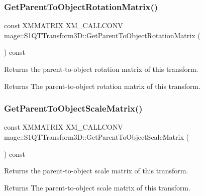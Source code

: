 \subsubsection{\texorpdfstring{Get\+Parent\+To\+Object\+Rotation\+Matrix()}{GetParentToObjectRotationMatrix()}}
{\footnotesize\ttfamily const X\+M\+M\+A\+T\+R\+IX X\+M\+\_\+\+C\+A\+L\+L\+C\+O\+NV mage\+::\+S1\+Q\+T\+Transform3\+D\+::\+Get\+Parent\+To\+Object\+Rotation\+Matrix (\begin{DoxyParamCaption}{ }\end{DoxyParamCaption}) const\hspace{0.3cm}{\ttfamily [noexcept]}}

Returns the parent-\/to-\/object rotation matrix of this transform.

\begin{DoxyReturn}{Returns}
The parent-\/to-\/object rotation matrix of this transform. 
\end{DoxyReturn}
\mbox{\label{classmage_1_1_s1_q_t_transform3_d_af4ddd29d84023da0b96c41eede9d850c}} 
\subsubsection{\texorpdfstring{Get\+Parent\+To\+Object\+Scale\+Matrix()}{GetParentToObjectScaleMatrix()}}
{\footnotesize\ttfamily const X\+M\+M\+A\+T\+R\+IX X\+M\+\_\+\+C\+A\+L\+L\+C\+O\+NV mage\+::\+S1\+Q\+T\+Transform3\+D\+::\+Get\+Parent\+To\+Object\+Scale\+Matrix (\begin{DoxyParamCaption}{ }\end{DoxyParamCaption}) const\hspace{0.3cm}{\ttfamily [noexcept]}}

Returns the parent-\/to-\/object scale matrix of this transform.

\begin{DoxyReturn}{Returns}
The parent-\/to-\/object scale matrix of this transform. 
\end{DoxyReturn}
\mbox{\label{classmage_1_1_s1_q_t_transform3_d_a76b84cc8993f5813b15285555fc5a859}} 
